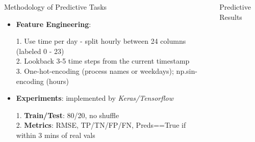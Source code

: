 \documentclass[final]{beamer}
\newlength{\sepwidth}
\newlength{\colwidth}
\newcommand{\separatorcolumn}{\begin{column}{\sepwidth}\end{column}}
\begin{document}
\begin{frame}[t]
\begin{columns}[t]
\begin{column}{\colwidth}
\begin{exampleblock}{\LARGE{Methodology of Predictive Tasks}}
{\begin{itemize}
            \item \textbf{Feature Engineering}:

                  1. Use time per day - split hourly between 24 columns (labeled 0 - 23)\\
                  2. Lookback 3-5 time steps from the current timestamp\\
                  3. One-hot-encoding (process names or weekdays); np.sin-encoding (hours)

            \item \textbf{Experiments}: implemented by \textit{Keras/Tensorflow}

                  1. \textbf{Train/Test}: 80/20, no shuffle\\
                  2. \textbf{Metrics}: RMSE, TP/TN/FP/FN, Preds==True if within 3 mins of real vals

          \end{itemize} }
      \end{exampleblock}

    \end{column}

    \separatorcolumn

    \begin{column}{\colwidth}

      \begin{block}
        {\LARGE{Predictive Results}}



\end{block}
\end{column}
\end{columns}
\end{frame}
\end{document}
